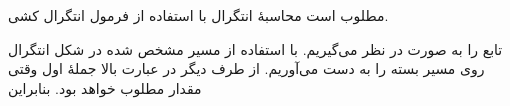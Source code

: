 \begin{EMexample}{}

مطلوب است محاسبهٔ انتگرال  با استفاده از فرمول انتگرال کشی.

تابع  را به صورت  در نظر می‌گیریم. با استفاده از مسیر مشخص شده در شکل انتگرال روی مسیر بسته را به دست می‌آوریم.
از طرف دیگر
در عبارت بالا جملهٔ اول وقتی  مقدار مطلوب خواهد بود.
بنابراین

\end{EMexample}

\begin{EMunit}


\end{EMunit}

